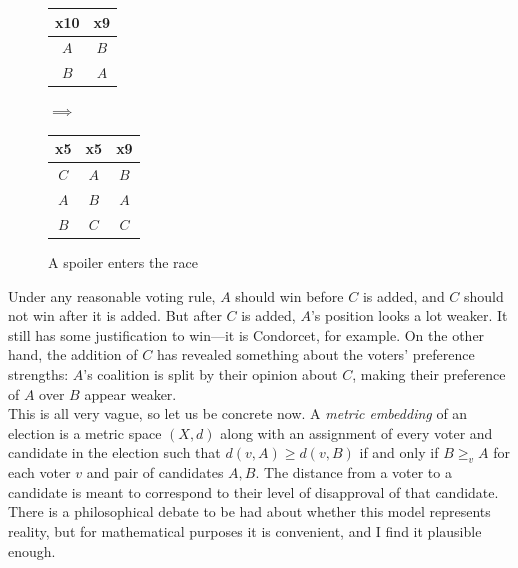 \documentclass{amsart}
\begin{document}
\begin{figure}[h]
\begin{center}
	\begin{tabular}{|c|c|}
		\hline
		x10 & x9\\
		\hline
		$A$ & $B$\\
		\hline
		$B$ & $A$\\
		\hline
	\end{tabular}
	$\implies$ 
	\begin{tabular}{|c|c|c|}
		\hline
		x5 & x5 & x9\\
		\hline
		$C$ & $A$ & $B$\\
		\hline
		$A$ & $B$ & $A$\\
		\hline
		$B$ & $C$ & $C$\\
		\hline 
	\end{tabular}
\end{center}
\caption{A spoiler enters the race}
\end{figure}

Under any reasonable voting rule, $A$ should win before $C$ is added, and $C$ should not win after it is added. But after $C$ is added, $A$'s position looks a lot weaker. It still has some justification to win---it is Condorcet, for example. On the other hand, the addition of $C$ has revealed something about the voters' preference strengths: $A$'s coalition is split by their opinion about $C$, making their preference of $A$ over $B$ appear weaker.\\

This is all very vague, so let us be concrete now. A \textit{metric embedding} of an election is a metric space $(X,d)$ along with an assignment of every voter and candidate in the election such that $d(v,A)\geq d(v,B)$ if and only if $B\geq_v A$ for each voter $v$ and pair of candidates $A,B$. The distance from a voter to a candidate is meant to correspond to their level of disapproval of that candidate. There is a philosophical debate to be had about whether this model represents reality, but for mathematical purposes it is convenient, and I find it plausible enough.
\end{document}
